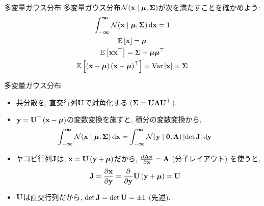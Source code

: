 \documentclass[dvipdfmx,notheorems,t]{beamer}
\begin{document}
\begin{frame}{多変量ガウス分布}
多変量ガウス分布$\mathcal{N}(\vb{x} \mid \vb*{\mu}, \vb{\Sigma})$が次を満たすことを確かめよう:
\begin{gather*}
  \int_{-\boldsymbol{\infty}}^{\boldsymbol{\infty}} \mathcal{N}(\vb{x} \mid \vb*{\mu}, \vb{\Sigma}) \dd{\vb{x}} = 1 \\
  \operatorname{\mathbb{E}} \left[ \vb{x} \right] = \vb*{\mu} \\
  \operatorname{\mathbb{E}} \left[ \vb{x} \vb{x}^\top \right] = \vb{\Sigma} + \vb*{\mu} \vb*{\mu}^\top \\
  \operatorname{\mathbb{E}} \left[ \left( \vb{x} - \vb*{\mu} \right) \left( \vb{x} - \vb*{\mu} \right)^\top \right] = \operatorname{Var} \left[ \vb{x} \right] = \vb{\Sigma}
\end{gather*}
\end{frame}

\begin{frame}{多変量ガウス分布}
\begin{itemize}
  \item 共分散を, 直交行列$\vb{U}$で対角化する ($\vb{\Sigma} = \vb{U} \vb{\Lambda} \vb{U}^\top$).
  \item $\vb{y} = \vb{U}^\top \left( \vb{x} - \vb*{\mu} \right)$の変数変換を施すと, 積分の変数変換から,
  \begin{align*}
    \int_{-\boldsymbol{\infty}}^{\boldsymbol{\infty}} \mathcal{N}(\vb{x} \mid \vb*{\mu}, \vb{\Sigma}) \dd{\vb{x}}
    &= \int_{-\boldsymbol{\infty}}^{\boldsymbol{\infty}} \mathcal{N}(\vb{y} \mid \vb{0}, \vb{\Lambda})
      \left| \det \vb{J} \right| \dd{\vb{y}}
  \end{align*}
  \item ヤコビ行列$\vb{J}$は, $\vb{x} = \vb{U} \left( \vb{y} + \vb*{\mu} \right)$だから,
  $\pdv{\vb{A} \vb{x}}{\vb{x}} = \vb{A}$ (分子レイアウト) を使うと,
  \begin{align*}
    \vb{J} &= \pdv{\vb{x}}{\vb{y}} = \pdv{\vb{y}} \vb{U} \left( \vb{y} + \vb*{\mu} \right) = \vb{U}
  \end{align*}
  \item $\vb{U}$は直交行列だから, $\det \vb{J} = \det \vb{U} = \pm 1$ (先述).
\end{itemize}
\end{frame}
\end{document}
